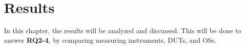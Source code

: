\chapter{Results}\label{ch:results}

In this chapter, the results will be analyzed and discussed. This will be done to answer \textbf{RQ2-4}, by comparing measuring instruments, DUTs, and OSs.







